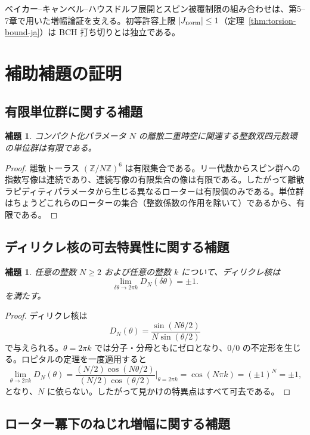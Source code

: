 \documentclass[dvipdfmx,a4paper]{article}
\newtheorem{lemma}[theorem]{補題}
\theoremstyle{definition}
\theoremstyle{remark}
\newcommand{\Jnorm}{J_{\rm norm}}
\begin{document}
ベイカー--キャンベル--ハウスドルフ展開とスピン被覆制限の組み合わせは、第5--7章で用いた増幅論証を支える。初等許容上限 $|\Jnorm| \leq 1$（定理~\ref{thm:torsion-bound-ja}）は BCH 打ち切りとは独立である。

\section{補助補題の証明}

\subsection{有限単位群に関する補題}

\begin{lemma}
コンパクト化パラメータ $N$ の離散二重時空に関連する整数双四元数環の単位群は有限である。
\end{lemma}

\begin{proof}
離散トーラス $(\mathbb{Z}/N\mathbb{Z})^6$ は有限集合である。リー代数からスピン群への指数写像は連続であり、連続写像の有限集合の像は有限である。したがって離散ラピディティパラメータから生じる異なるローターは有限個のみである。単位群はちょうどこれらのローターの集合（整数係数の作用を除いて）であるから、有限である。
\end{proof}

\subsection{ディリクレ核の可去特異性に関する補題}

\begin{lemma}
任意の整数 $N \geq 2$ および任意の整数 $k$ について、ディリクレ核は
\[
\lim_{\delta\theta \to 2\pi k} D_N(\delta\theta) = \pm 1.
\]
を満たす。
\end{lemma}

\begin{proof}
ディリクレ核は
\[
D_N(\theta) = \frac{\sin(N\theta/2)}{N\sin(\theta/2)}
\]
で与えられる。$\theta = 2\pi k$ では分子・分母ともにゼロとなり、$0/0$ の不定形を生じる。ロピタルの定理を一度適用すると
\[
\lim_{\theta \to 2\pi k} D_N(\theta) = \frac{(N/2)\cos(N\theta/2)}{(N/2)\cos(\theta/2)} \Big|_{\theta=2\pi k} = \cos(N\pi k) = (\pm 1)^N = \pm 1,
\]
となり、$N$ に依らない。したがって見かけの特異点はすべて可去である。
\end{proof}

\subsection{ローター冪下のねじれ増幅に関する補題}
\end{document}
